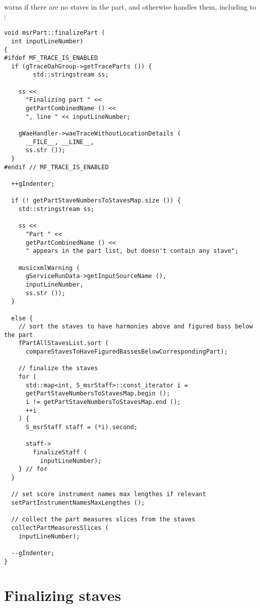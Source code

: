  warns if there are no staves in the part, and otherwise handles them, including \cascading to :
\begin{lstlisting}[language=CPlusPlus]
void msrPart::finalizePart (
  int inputLineNumber)
{
#ifdef MF_TRACE_IS_ENABLED
  if (gTraceOahGroup->getTraceParts ()) {
		std::stringstream ss;

    ss <<
      "Finalizing part " <<
      getPartCombinedName () <<
      ", line " << inputLineNumber;

    gWaeHandler->waeTraceWithoutLocationDetails (
      __FILE__, __LINE__,
      ss.str ());
  }
#endif // MF_TRACE_IS_ENABLED

  ++gIndenter;

  if (! getPartStaveNumbersToStavesMap.size ()) {
    std::stringstream ss;

    ss <<
      "Part " <<
      getPartCombinedName () <<
      " appears in the part list, but doesn't contain any stave";

    musicxmlWarning (
      gServiceRunData->getInputSourceName (),
      inputLineNumber,
      ss.str ());
  }

  else {
    // sort the staves to have harmonies above and figured bass below the part
    fPartAllStavesList.sort (
      compareStavesToHaveFiguredBassesBelowCorrespondingPart);

    // finalize the staves
    for (
      std::map<int, S_msrStaff>::const_iterator i =
      getPartStaveNumbersToStavesMap.begin ();
      i != getPartStaveNumbersToStavesMap.end ();
      ++i
    ) {
      S_msrStaff staff = (*i).second;

      staff->
        finalizeStaff (
          inputLineNumber);
    } // for
  }

  // set score instrument names max lengthes if relevant
  setPartInstrumentNamesMaxLengthes ();

  // collect the part measures slices from the staves
  collectPartMeasuresSlices (
    inputLineNumber);

  --gIndenter;
}
\end{lstlisting}



\section{Finalizing staves}

